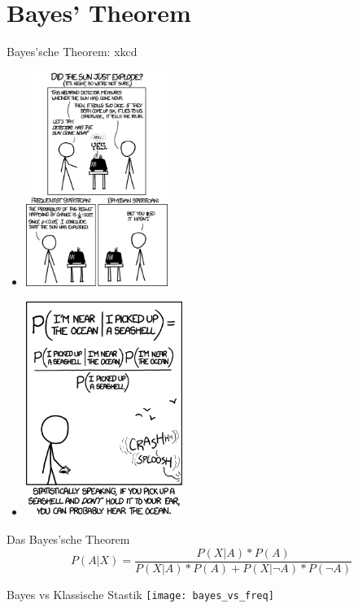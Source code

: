 \section{Bayes' Theorem}


\begin{frame}[c]{Bayes'sche Theorem: xkcd}
    \begin{multicols}{2}
    \begin{itemize}
        \item[]<1> \includegraphics[height=7cm]{strategy/xkcd_frequentists_vs_bayesians.png}
        \item[]<2> \includegraphics[height=7cm]{strategy/xkcd_seashell.png}
    \end{itemize}
    \end{multicols}
\end{frame}


\begin{frame}[c]{Das Bayes'sche Theorem}
    \Large
    \[
        P(A|X) = \frac{P(X|A) * P(A)}{P(X|A) * P(A) + P(X|\neg A) * P(\neg A)}
    \]
\end{frame}


\begin{frame}[c]{Bayes vs Klassische Stastik}
    \texttt{[image: bayes\_vs\_freq]}
\end{frame}



